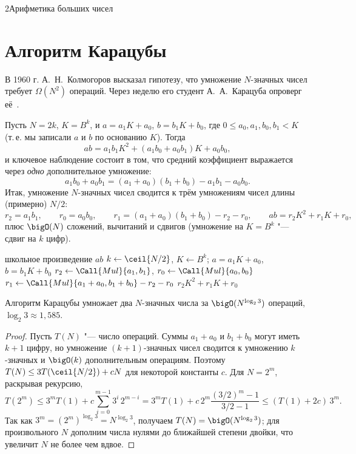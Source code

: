 \begin{lecture}{2}{Арифметика больших чисел}
\section{Алгоритм Карацубы}

В 1960 г. А.~Н.~Колмогоров высказал гипотезу, что умножение $N$-значных чисел требует
$\Omega(N^2)$ операций. Через неделю его студент А.~А.~Карацуба опроверг её~\cite{karatsuba-ofman}.

Пусть $N = 2k$, $K = B^k$, и $a = a_1 K + a_0$, $b = b_1 K + b_0$, где $0 \le a_0, a_1, b_0, b_1 < K$
(т.\,е. мы записали $a$ и $b$ по основанию $K$). Тогда
\[
  ab = a_1 b_1 K^2 + (a_1 b_0 + a_0 b_1) K + a_0 b_0,
\]
и ключевое наблюдение состоит в том, что средний коэффициент выражается через \emph{одно}
дополнительное умножение:
\[
  a_1 b_0 + a_0 b_1 = (a_1 + a_0)(b_1 + b_0) - a_1 b_1 - a_0 b_0.
\]
Итак, умножение $N$-значных чисел сводится к трём умножениям чисел длины (примерно) $N/2$:
\[
  r_2 = a_1 b_1, \qquad r_0 = a_0 b_0, \qquad r_1 = (a_1 + a_0)(b_1 + b_0) - r_2 - r_0, \qquad
  ab = r_2 K^2 + r_1 K + r_0,
\]
плюс $\bigO(N)$ сложений, вычитаний и сдвигов (умножение на $K = B^k$ "--- сдвиг на $k$ цифр).

\begin{algorithm}[Карацуба]
\begin{algorithmic}[1]
 
   \State \Return школьное произведение $ab$ \EndIf
  \State $k \gets \ceil{N/2}$, $K \gets B^k$; $a = a_1 K + a_0$, $b = b_1 K + b_0$
  \State $r_2 \gets \Call{Mul}{a_1, b_1}$, $r_0 \gets \Call{Mul}{a_0, b_0}$
  \State $r_1 \gets \Call{Mul}{a_1 + a_0, b_1 + b_0} - r_2 - r_0$
  \State \Return $r_2 K^2 + r_1 K + r_0$
\EndFunction
\end{algorithmic}
\end{algorithm}

\begin{theorem}\label{l2:karatsuba}
Алгоритм Карацубы умножает два $N$-значных числа за $\bigO(N^{\log_2 3})$ операций,
$\log_2 3 \approx 1{,}585$.
\end{theorem}

\begin{proof}
Пусть $T(N)$ "--- число операций. Суммы $a_1 + a_0$ и $b_1 + b_0$ могут иметь $k + 1$ цифру,
но умножение $(k+1)$-значных чисел сводится к умножению $k$-значных и $\bigO(k)$ дополнительным
операциям. Поэтому $T(N) \le 3T(\ceil{N/2}) + cN$ для некоторой константы $c$. Для $N = 2^m$,
раскрывая рекурсию,
\[
  T(2^m) \le 3^m T(1) + c \sum_{i=0}^{m-1} 3^i \, 2^{m-i}
  = 3^m T(1) + c\,2^m \frac{(3/2)^m - 1}{3/2 - 1} \le (T(1) + 2c)\, 3^m.
\]
Так как $3^m = (2^m)^{\log_2 3} = N^{\log_2 3}$, получаем $T(N) = \bigO(N^{\log_2 3})$; для
произвольного $N$ дополним числа нулями до ближайшей степени двойки, что увеличит $N$ не более
чем вдвое.
\end{proof}


\end{lecture}
